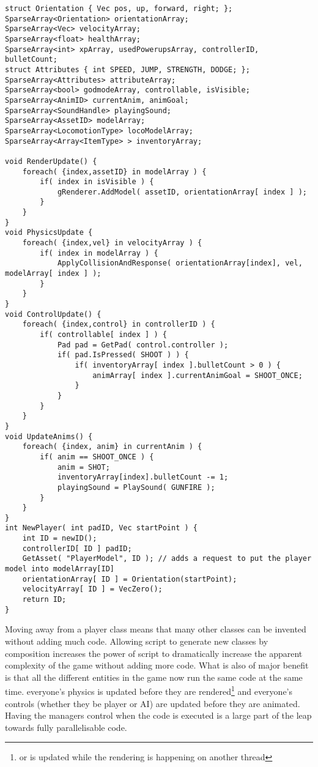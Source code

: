 \begin{lstlisting}
struct Orientation { Vec pos, up, forward, right; };
SparseArray<Orientation> orientationArray;
SparseArray<Vec> velocityArray;
SparseArray<float> healthArray;
SparseArray<int> xpArray, usedPowerupsArray, controllerID, bulletCount;
struct Attributes { int SPEED, JUMP, STRENGTH, DODGE; };
SparseArray<Attributes> attributeArray;
SparseArray<bool> godmodeArray, controllable, isVisible;
SparseArray<AnimID> currentAnim, animGoal;
SparseArray<SoundHandle> playingSound;
SparseArray<AssetID> modelArray;
SparseArray<LocomotionType> locoModelArray;
SparseArray<Array<ItemType> > inventoryArray;

void RenderUpdate() {
	foreach( {index,assetID} in modelArray ) {
		if( index in isVisible ) {
			gRenderer.AddModel( assetID, orientationArray[ index ] );
		}
	}
}
void PhysicsUpdate {
	foreach( {index,vel} in velocityArray ) {
		if( index in modelArray ) {
			ApplyCollisionAndResponse( orientationArray[index], vel, modelArray[ index ] );
		}
	}
}
void ControlUpdate() {
	foreach( {index,control} in controllerID ) {
		if( controllable[ index ] ) {
			Pad pad = GetPad( control.controller );
			if( pad.IsPressed( SHOOT ) ) {
				if( inventoryArray[ index ].bulletCount > 0 ) {
					animArray[ index ].currentAnimGoal = SHOOT_ONCE;
				}
			}
		}
	}
}
void UpdateAnims() {
	foreach( {index, anim} in currentAnim ) {
		if( anim == SHOOT_ONCE ) {
			anim = SHOT;
			inventoryArray[index].bulletCount -= 1;
			playingSound = PlaySound( GUNFIRE );
		}
	}
}
int NewPlayer( int padID, Vec startPoint ) {
	int ID = newID();
	controllerID[ ID ] padID;
	GetAsset( "PlayerModel", ID ); // adds a request to put the player model into modelArray[ID]
	orientationArray[ ID ] = Orientation(startPoint);
	velocityArray[ ID ] = VecZero();
	return ID;
}
\end{lstlisting}

Moving away from a player class means that many other classes can be invented
without adding much code. Allowing script to generate new classes by
composition increases the power of script to dramatically increase the apparent
complexity of the game without adding more code. What is also of major benefit
is that all the different entities in the game now run the same code at the
same time. everyone's physics is updated before they are rendered\footnote{or
is updated while the rendering is happening on another thread} and everyone's
controls (whether they be player or AI) are updated before they are animated.
Having the managers control when the code is executed is a large part of the
leap towards fully parallelisable code.

